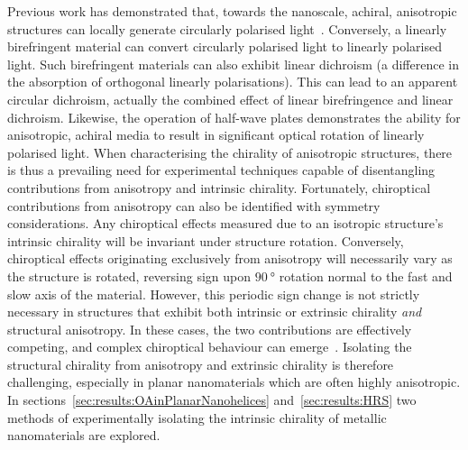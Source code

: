 Previous work has demonstrated that, towards the nanoscale, achiral, anisotropic structures can locally generate circularly polarised light~\cite{Hashiyada2018}. Conversely, a linearly birefringent material can convert circularly polarised light to linearly polarised light. 
Such birefringent materials can also exhibit linear dichroism (a difference in the absorption of orthogonal linearly polarisations). This can lead to an apparent circular dichroism, actually the combined effect of linear birefringence and linear dichroism. Likewise, the operation of half-wave plates demonstrates the ability for anisotropic, achiral media to result in significant optical rotation of linearly polarised light. 
When characterising the chirality of anisotropic structures, there is thus a prevailing need for experimental techniques capable of disentangling contributions from anisotropy and intrinsic chirality. 
Fortunately, chiroptical contributions from anisotropy can also be identified with symmetry considerations. Any chiroptical effects measured due to an isotropic structure's intrinsic chirality will be invariant under structure rotation. Conversely, chiroptical effects originating exclusively from anisotropy will necessarily vary as the structure is rotated, reversing sign upon $\SI{90}{\degree}$ rotation normal to the fast and slow axis of the material. However, this periodic sign change is not strictly necessary in structures that exhibit both intrinsic or extrinsic chirality \textit{and} structural anisotropy. In these cases, the two contributions are effectively competing, and complex chiroptical behaviour can emerge~\cite{Hooper2017}. Isolating the structural chirality from anisotropy and extrinsic chirality is therefore challenging, especially in planar nanomaterials which are often highly anisotropic. In sections~\ref{sec:results:OAinPlanarNanohelices} and~\ref{sec:results:HRS} two methods of experimentally isolating the intrinsic chirality of metallic nanomaterials are explored.


